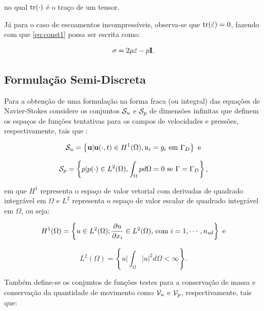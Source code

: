 \documentclass[_ArquivoPrincipal.tex]{subfiles}
\begin{document}
\noindent no qual $\mathop{\mathrm{tr}}\nolimits(\cdot)$ é o traço de um tensor.

Já para o caso de escoamentos incompressíveis, observa-se que $\mathop{\mathrm{tr}}\nolimits(\dot{\mathbf{\varepsilon}})=0$, fazendo com que \ref{eq:const1} possa ser escrita como:

\begin{equation}
    \mathbf{\sigma}=2\mu\dot{\mathbf{\varepsilon}}-p\mathbf{I}\text{.}\label{eq:ModConst}
\end{equation}

\subsection{Formulação Semi-Discreta} \label{FSD}

Para a obtenção de uma formulação na forma fraca (ou integral) das equações de Navier-Stokes considere os conjuntos $\mathcal{S}_u$ e $\mathcal{S}_p$ de dimensões infinitas que definem os espaços de funções tentativas para os campos de velocidades e pressões, respectivamente, tais que \cite{bazilevs2013computational,fernandes2020tecnica}:

\begin{equation}
    \mathcal{S}_u=\left\{\mathbf{u}|\mathbf{u}(\cdot,t)\in H^1(\Omega),u_i=g_i\text{ em }\Gamma_D\right\}\text{ e}
\end{equation}

\begin{equation}
    \mathcal{S}_p=\left\{p|p(\cdot)\in L^2(\Omega),\int_\Omega{pd\Omega}=0\text{ se }\Gamma=\Gamma_D\right\}\text{,}
\end{equation}

\noindent em que $H^1$ representa o espaço de valor vetorial com derivadas de quadrado integrável em $\Omega$ e $L^2$ representa o espaço de valor escalar de quadrado integrável em $\Omega$, ou seja:

\begin{equation}
    H^1(\Omega)=\left\{u\in L^2(\Omega);\frac{\partial{u}}{\partial{x_i}}\in L^2(\Omega)\text{, com }i=1,\cdots,n_{sd}\right\}\text{ e}
\end{equation}

\begin{equation}
    L^2(\Omega)=\left\{u|\int_\Omega{|u|^2d\Omega}<\infty\right\}\text{.}
\end{equation}

Também define-se os conjuntos de funções testes para a conservação de massa e conservação da quantidade de movimento como $\mathcal{V}_u$ e $\mathcal{V}_p$, respectivamente, tais que:
\end{document}
